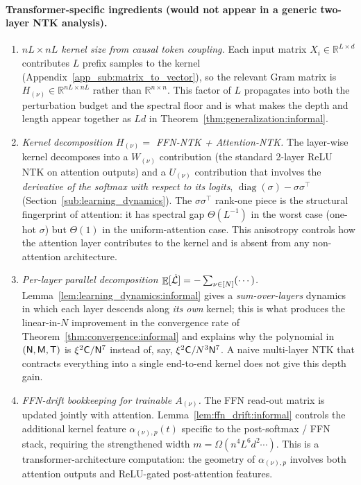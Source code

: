 \documentclass[11pt]{article}
\theoremstyle{plain}
\DeclareMathOperator*{\E}{{\mathbb{E}}}
\DeclareMathOperator{\diag}{diag}
\begin{document}
\paragraph{Transformer-specific ingredients (would not appear in a generic two-layer NTK analysis).}
\begin{enumerate}
    \item[(T1)] {\it $nL\times nL$ kernel size from causal token coupling.} Each input matrix $X_i\in\mathbb{R}^{L\times d}$ contributes $L$ prefix samples to the kernel (Appendix~\ref{app_sub:matrix_to_vector}), so the relevant Gram matrix is $H_{(\nu)}\in\mathbb{R}^{nL\times nL}$ rather than $\mathbb{R}^{n\times n}$. This factor of $L$ propagates into both the perturbation budget and the spectral floor and is what makes the depth and length appear together as $Ld$ in Theorem~\ref{thm:generalization:informal}.
    \item[(T2)] {\it Kernel decomposition $H_{(\nu)} = $ FFN-NTK + Attention-NTK.} The layer-wise kernel decomposes into a $W_{(\nu)}$ contribution (the standard 2-layer ReLU NTK on attention outputs) and a $U_{(\nu)}$ contribution that involves the {\it derivative of the softmax with respect to its logits}, $\diag(\sigma) - \sigma\sigma^\top$ (Section~\ref{sub:learning_dynamics}). The $\sigma\sigma^\top$ rank-one piece is the structural fingerprint of attention: it has spectral gap $\Theta(L^{-1})$ in the worst case (one-hot $\sigma$) but $\Theta(1)$ in the uniform-attention case. This anisotropy controls how the attention layer contributes to the kernel and is absent from any non-attention architecture.
    \item[(T3)] {\it Per-layer parallel decomposition $\E[\dot{\cal L}] = -\sum_{\nu\in[N]}(\cdots)$.} Lemma~\ref{lem:learning_dynamics:informal} gives a {\it sum-over-layers} dynamics in which each layer descends along {\it its own} kernel; this is what produces the linear-in-$N$ improvement in the convergence rate of Theorem~\ref{thm:convergence:informal} and explains why the polynomial in $({\sf N},{\sf M},{\sf T})$ is $\xi^2{\sf C}/{\sf N}^7$ instead of, say, $\xi^2{\sf C}/N^3{\sf N}^7$. A naive multi-layer NTK that contracts everything into a single end-to-end kernel does not give this depth gain.
    \item[(T4)] {\it FFN-drift bookkeeping for trainable $A_{(\nu)}$.} The FFN read-out matrix is updated jointly with attention. Lemma~\ref{lem:ffn_drift:informal} controls the additional kernel feature $\alpha_{(\nu),p}(t)$ specific to the post-softmax / FFN stack, requiring the strengthened width $m=\Omega(n^4 L^6 d^2 \cdots)$. This is a transformer-architecture computation: the geometry of $\alpha_{(\nu),p}$ involves both attention outputs and ReLU-gated post-attention features.
\end{enumerate}
\end{document}
